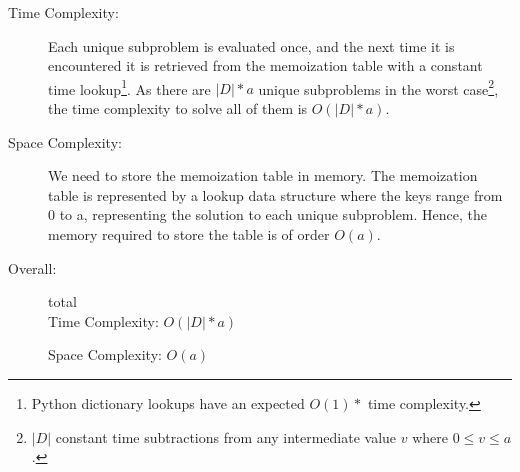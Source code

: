 \begin{description}
    \item[Time Complexity:]
        Each unique subproblem is evaluated once, and the next time it is encountered it is retrieved from the memoization table with a constant time lookup\footnote{Python dictionary lookups have an expected $O(1)*$ time complexity.}.
        As there are $|D| * a$ unique subproblems in the worst case\footnote{$|D|$ constant time subtractions from any intermediate value $v$ where $0 \leq v \leq a$.}, the time complexity to solve all of them is $O(|D| * a)$.
    
        
    \item[Space Complexity:] 
        We need to store the memoization table in memory.
        The memoization table is represented by a lookup data structure where the keys range from 0 to a,
        representing the solution to each unique subproblem.
        Hence, the memory required to store the table is of order $O(a)$.
        
    \item[Overall:] total\\
        Time Complexity: $O(|D| * a)$

        Space Complexity: $O(a)$
        
\end{description}

